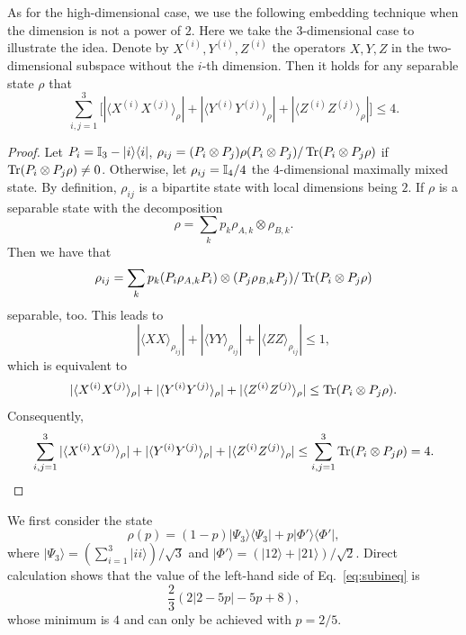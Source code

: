 As for the high-dimensional case, we use the following embedding technique when the dimension is not a power of $2$. Here we take the $3$-dimensional case to illustrate the idea.
Denote by $X^{(i)}, Y^{(i)}, Z^{(i)}$ the operators $X, Y, Z$ in the two-dimensional subspace without the $i$-th dimension. Then it holds for any separable state $\rho$  that
\begin{equation}\label{eq:subineq}
	\sum_{i,j=1}^3 \big[ |\langle X^{(i)} X^{(j)}\rangle_{\rho}| + |\langle Y^{(i)} Y^{(j)}\rangle_{\rho}| + |\langle Z^{(i)} Z^{(j)}\rangle_{\rho}|\big] \le 4.
\end{equation}
\begin{proof}
	Let $P_i = \mathbb{I}_3 - |i\rangle\langle i|$, $\rho_{ij} = (P_i\otimes P_j) \rho (P_i\otimes P_j) /\operatorname{Tr}(P_i\otimes P_j \rho)$ if $\operatorname{Tr}(P_i\otimes P_j \rho) \neq 0$. Otherwise, let $\rho_{ij} = \mathbb{I}_4/4$ the $4$-dimensional maximally mixed state. 
	By definition, $\rho_{ij}$ is a bipartite state with local dimensions being $2$. If $\rho$ is a separable state with the decomposition
	\begin{equation}
		\rho = \sum_k p_k \rho_{A,k} \otimes \rho_{B,k}.
	\end{equation}
	Then we have that
	\begin{equation}
		\rho_{ij} = \sum_k p_k (P_i\rho_{A,k}P_i) \otimes (P_j\rho_{B,k}P_j)/\operatorname{Tr}(P_i\otimes P_j \rho)
	\end{equation}
	separable, too.
	This leads to
	\begin{equation}
		|\langle XX\rangle_{\rho_{ij}}|
		+|\langle YY\rangle_{\rho_{ij}}|
		+|\langle ZZ\rangle_{\rho_{ij}}| \le 1,
	\end{equation}
	which is equivalent to
\begin{equation}
	|\langle X^{(i)} X^{(j)}\rangle_{\rho}| + |\langle Y^{(i)} Y^{(j)}\rangle_{\rho}| + |\langle Z^{(i)} Z^{(j)}\rangle_{\rho}| \le \operatorname{Tr}(P_i\otimes P_j \rho).
\end{equation}
Consequently,
\begin{equation}
	\sum_{i,j=1}^3 |\langle X^{(i)} X^{(j)}\rangle_{\rho}| + |\langle Y^{(i)} Y^{(j)}\rangle_{\rho}| + |\langle Z^{(i)} Z^{(j)}\rangle_{\rho}| \le \sum_{i,j=1}^3 \operatorname{Tr}(P_i\otimes P_j \rho) = 4.
\end{equation}
\end{proof}
We first consider the state
\begin{equation}
    \rho(p) = (1-p) |\Psi_3\rangle\langle \Psi_3| + p |\Phi'\rangle\langle \Phi'|,
\end{equation}
where $|\Psi_3\rangle = (\sum_{i=1}^3 |ii\rangle)/\sqrt{3}$ and $|\Phi'\rangle = (|12\rangle + |21\rangle)/\sqrt{2}$. 
Direct calculation shows that the value of the left-hand side of Eq.~\eqref{eq:subineq} is
\begin{equation}
\frac{2}{3}(2 | 2-5 p| -5 p+8),
\end{equation}
whose minimum is $4$ and can only be achieved with $p=2/5$.

